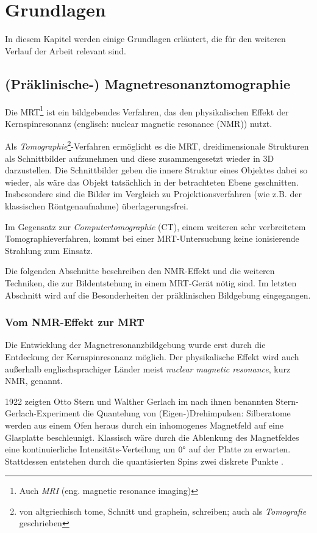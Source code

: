 \chapter{Grundlagen}
In diesem Kapitel werden einige Grundlagen erläutert, die für den weiteren Verlauf der Arbeit relevant sind.

\section{(Präklinische-) Magnetresonanztomographie}
Die MRT\footnote{Auch \textit{MRI} (eng. magnetic resonance imaging)} ist ein bildgebendes Verfahren, das den physikalischen Effekt der Kernspinresonanz (englisch: nuclear magnetic resonance (NMR)) nutzt.

Als \textit{Tomographie}\footnote{von altgriechisch tome, Schnitt und graphein, schreiben; auch als \textit{Tomografie} geschrieben}-Verfahren ermöglicht es die MRT, dreidimensionale Strukturen als Schnittbilder aufzunehmen und diese zusammengesetzt wieder in 3D darzustellen. Die Schnittbilder geben die innere Struktur eines Objektes dabei so wieder, als wäre das Objekt tatsächlich in der betrachteten Ebene geschnitten. Insbesondere sind die Bilder im Vergleich zu Projektionsverfahren (wie z.B. der klassischen Röntgenaufnahme) über\-lagerungs\-frei.

Im Gegensatz zur \textit{Computertomographie} (CT), einem weiteren sehr verbreitetem Tomographieverfahren, kommt bei einer MRT-Untersuchung keine ionisierende Strahlung zum Einsatz.

Die folgenden Abschnitte beschreiben den NMR-Effekt und die weiteren Techniken, die zur Bildentstehung in einem MRT-Gerät nötig sind. Im letzten Abschnitt wird auf die Besonderheiten der präklinischen Bildgebung eingegangen.

\subsection{Vom NMR-Effekt zur MRT}
Die Entwicklung der Magnetresonanzbildgebung wurde erst durch die Entdeckung der Kernspinresonanz möglich. Der physikalische Effekt wird auch außerhalb englischsprachiger Länder meist \textit{nuclear magnetic resonance}, kurz NMR, genannt.

1922 zeigten Otto Stern und Walther Gerlach im nach ihnen benannten Stern-Gerlach-Experiment die Quantelung von (Eigen-)Drehimpulsen: Silberatome werden aus einem Ofen heraus durch ein inhomogenes Magnetfeld auf eine Glasplatte beschleunigt. Klassisch wäre durch die Ablenkung des Magnetfeldes eine kontinuierliche Intensitäts-Verteilung um $0\degree$ auf der Platte zu erwarten. Stattdessen entstehen durch die quantisierten Spins zwei diskrete Punkte \cite{Gerlach1922}.

